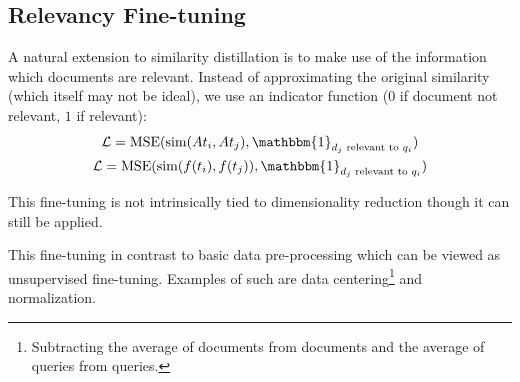 
\subsection{Relevancy Fine-tuning}

A natural extension to similarity distillation is to make use of the information which documents are relevant. Instead of approximating the original similarity (which itself may not be ideal), we use an indicator function ($0$ if document not relevant, $1$ if relevant):
\begin{gather*}
\mathcal{L}=\text{MSE}(\text{sim}(A t_i, A t_j), \mathbbm{1}_{d_j \text{ relevant to } q_i})  \\
\mathcal{L}=\text{MSE}(\text{sim}(f(t_i), f(t_j)),  \mathbbm{1}_{d_j \text{ relevant to } q_i})
\end{gather*}

This fine-tuning is not intrinsically tied to dimensionality reduction though it can still be applied.

This fine-tuning in contrast to basic data pre-processing which can be viewed as unsupervised fine-tuning. Examples of such are data centering\footnote{Subtracting the average of documents from documents and the average of queries from queries.}  and normalization. 
